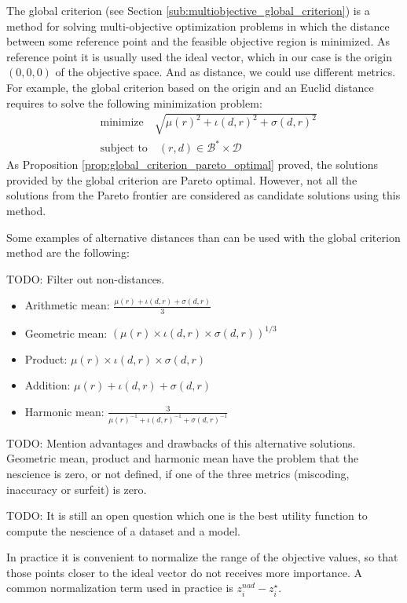 The global criterion (see Section \ref{sub:multiobjective_global_criterion}) is a method for solving multi-objective optimization problems in which the distance between some reference point and the feasible objective region is minimized. As reference point it is usually used the ideal vector, which in our case is the origin $(0, 0, 0)$ of the objective space. And as distance, we could use different metrics. For example, the global criterion based on the origin and an Euclid distance requires to solve the following minimization problem:
\begin{align*}
    & \text{minimize} \quad \sqrt{ \mu(r)^2 + \iota(d, r)^2 + \sigma(d, r)^2 } \\
    & \text{subject to} \quad (r, d) \in \mathcal{B}^\ast \times \mathcal{D}
\end{align*}
As Proposition \ref{prop:global_criterion_pareto_optimal} proved, the solutions provided by the global criterion are Pareto optimal. However, not all the solutions from the Pareto frontier are considered as candidate solutions using this method.

Some examples of alternative distances than can be used with the global criterion method are the following:

{\color{red} TODO: Filter out non-distances.}

\begin{itemize}
\item Arithmetic mean: $\frac{\mu(r) + \iota(d, r) + \sigma(d, r)}{3}$
\item Geometric mean: $\left( \mu(r) \times \iota(d, r) \times \sigma(d, r) \right)^{1/3}$
\item Product: $\mu(r) \times \iota(d, r) \times \sigma(d, r)$
\item Addition: $\mu(r) + \iota(d, r) + \sigma(d, r)$
\item Harmonic mean: $\frac{3}{ \mu(r)^{-1} + \iota(d, r)^{-1} + \sigma(d, r)^{-1} }$
\end{itemize}

{\color{red} TODO: Mention advantages and drawbacks of this alternative solutions.} Geometric mean, product and harmonic mean have the problem that the nescience is zero, or not defined, if one of the three metrics (miscoding, inaccuracy or surfeit) is zero.

{\color{red} TODO: It is still an open question which one is the best utility function to compute the nescience of a dataset and a model.}

{\color{red} In practice it is convenient to normalize the range of the objective values, so that those points closer to the ideal vector do not receives more importance. A common normalization term used in practice is $z_i^{nad} - z_i^\star$.}


